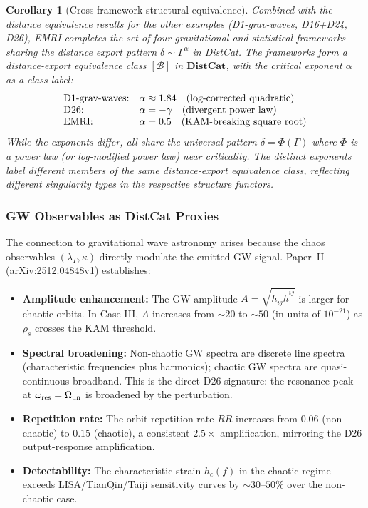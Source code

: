 \documentclass[
]{article}
\newtheorem{corollary}[theorem]{Corollary}
\begin{document}
\begin{corollary}[Cross-framework structural equivalence]\label{cor:cross-framework-emri}
Combined with the distance equivalence results for the other examples (D1-grav-waves, D16+D24, D26), EMRI completes the set of four gravitational and statistical frameworks sharing the distance export pattern $\delta \sim \Gamma^\alpha$ in DistCat. The frameworks form a distance-export equivalence class $[\mathcal{B}]$ in $\mathbf{DistCat}$, with the critical exponent $\alpha$ as a class label:
\begin{equation}
\begin{array}{l@{\quad}l}
\text{D1-grav-waves:} & \alpha \approx 1.84 \quad (\text{log-corrected quadratic}) \\
\text{D26:} & \alpha = -\gamma \quad (\text{divergent power law}) \\
\text{EMRI:} & \alpha = 0.5 \quad (\text{KAM-breaking square root})
\end{array}
\end{equation}
While the exponents differ, all share the universal pattern $\delta = \Phi(\Gamma)$ where $\Phi$ is a power law (or log-modified power law) near criticality. The distinct exponents label different members of the same distance-export equivalence class, reflecting different singularity types in the respective structure functors.
\end{corollary}

\subsubsection{GW Observables as DistCat Proxies}\label{subsec:gw-observables}

The connection to gravitational wave astronomy arises because the chaos observables $(\lambda_T, \kappa)$ directly modulate the emitted GW signal. Paper~II (arXiv:2512.04848v1) establishes:

\begin{itemize}
\item \textbf{Amplitude enhancement:} The GW amplitude $A = \sqrt{\dot{h}_{ij}\dot{h}^{ij}}$ is larger for chaotic orbits. In Case-III, $A$ increases from $\sim 20$ to $\sim 50$ (in units of $10^{-21}$) as $\rho_s$ crosses the KAM threshold.
\item \textbf{Spectral broadening:} Non-chaotic GW spectra are discrete line spectra (characteristic frequencies plus harmonics); chaotic GW spectra are quasi-continuous broadband. This is the direct D26 signature: the resonance peak at $\omega_{\rm res} = \Omega_{\rm un}$ is broadened by the perturbation.
\item \textbf{Repetition rate:} The orbit repetition rate $RR$ increases from $0.06$ (non-chaotic) to $0.15$ (chaotic), a consistent $2.5\times$ amplification, mirroring the D26 output-response amplification.
\item \textbf{Detectability:} The characteristic strain $h_c(f)$ in the chaotic regime exceeds LISA/TianQin/Taiji sensitivity curves by $\sim 30$--$50\%$ over the non-chaotic case.
\end{itemize}
\end{document}

